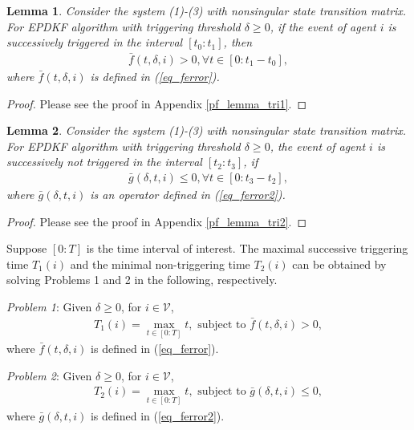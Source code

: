 \documentclass[journal,transmag]{IEEEtran}
\newtheorem{lemma}{\textbf{Lemma}}
\begin{document}
{\begin{lemma}\label{lem_trigger}
	Consider the system (1)-(3) with nonsingular state transition matrix. For EPDKF algorithm with triggering threshold $\delta\geq 0$, if the event of agent $i$ is successively triggered in the interval $[t_0:t_1]$, then
	\begin{align}
\bar f(t,\delta,i)>0, \forall  t\in [0:t_1-t_0], 
	\end{align}
 where $\bar f(t,\delta,i)$ is  defined in (\ref{eq_ferror}).
\end{lemma}
\begin{proof}
		Please see the proof in Appendix \ref{pf_lemma_tri1}.
\end{proof}
\begin{lemma}\label{lem_trigger2}
	Consider the system (1)-(3) with nonsingular state transition matrix. For EPDKF algorithm with triggering threshold $\delta\geq 0$,  the event of agent $i$ is successively not triggered in the interval $[t_2:t_3]$, if 
	\begin{align*}
\bar g(\delta,t,i)\leq 0, \forall t\in [0:t_3-t_2],
	\end{align*}
 where $\bar g(\delta,t,i)$ is an operator defined in (\ref{eq_ferror2}).
\end{lemma}
\begin{proof}
	Please see the proof in Appendix \ref{pf_lemma_tri2}.
\end{proof}
Suppose $[0:T]$ is the time interval of interest. The maximal successive triggering time $T_1(i)$ and the minimal non-triggering time $T_2(i)$   can be obtained by solving  Problems 1 and 2 in the following, respectively.

\emph{Problem 1}: Given $\delta\geq 0$, for	$i\in\mathcal{V}$,
\begin{align}
T_1(i)=\max_{t\in[0:T]} t, \text{ subject to } \bar f(t,\delta,i)>0,
\end{align}
where $\bar f(t,\delta,i)$ is defined in (\ref{eq_ferror}).

\emph{Problem 2}: Given $\delta\geq 0$, for	$i\in\mathcal{V}$,
\begin{align}
T_2(i)=\max_{t\in[0:T]} t,  \text{ subject to } \bar g(\delta,t,i)\leq 0,
\end{align}
where  $\bar g(\delta,t,i)$ is defined in (\ref{eq_ferror2}).

}
\end{document}
